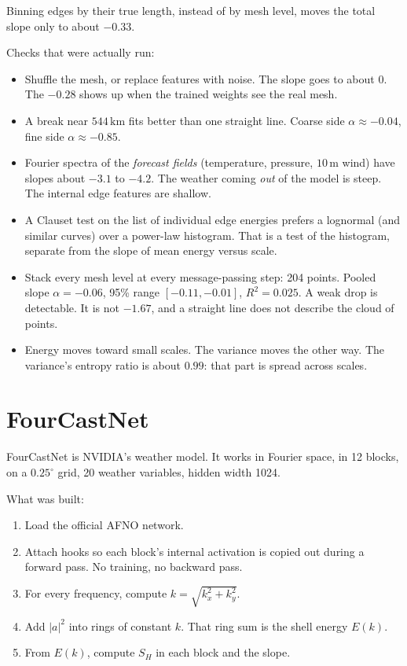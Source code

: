 \documentclass[11pt,a4paper]{article}
\begin{document}
Binning edges by their true length, instead of by mesh level, moves the total slope only to about \(-0.33\).

Checks that were actually run:
\begin{itemize}
  \item Shuffle the mesh, or replace features with noise. The slope goes to about \(0\). The \(-0.28\) shows up when the trained weights see the real mesh.
  \item A break near \(544\,\mathrm{km}\) fits better than one straight line. Coarse side \(\alpha \approx -0.04\), fine side \(\alpha \approx -0.85\).
  \item Fourier spectra of the \emph{forecast fields} (temperature, pressure, \(10\,\mathrm{m}\) wind) have slopes about \(-3.1\) to \(-4.2\). The weather coming \emph{out} of the model is steep. The internal edge features are shallow.
  \item A Clauset test on the list of individual edge energies prefers a lognormal (and similar curves) over a power-law histogram. That is a test of the histogram, separate from the slope of mean energy versus scale.
  \item Stack every mesh level at every message-passing step: 204 points. Pooled slope \(\alpha = -0.06\), 95\% range \([-0.11,-0.01]\), \(R^2 = 0.025\). A weak drop is detectable. It is not \(-1.67\), and a straight line does not describe the cloud of points.
  \item Energy moves toward small scales. The variance moves the other way. The variance's entropy ratio is about \(0.99\): that part is spread across scales.
\end{itemize}

\section*{FourCastNet}

FourCastNet is NVIDIA's weather model. It works in Fourier space, in 12 blocks, on a \(0.25^\circ\) grid, 20 weather variables, hidden width 1024.

What was built:
\begin{enumerate}
  \item Load the official AFNO network.
  \item Attach hooks so each block's internal activation is copied out during a forward pass. No training, no backward pass.
  \item For every frequency, compute \(k = \sqrt{k_x^2 + k_y^2}\).
  \item Add \(|a|^2\) into rings of constant \(k\). That ring sum is the shell energy \(E(k)\).
  \item From \(E(k)\), compute \(S_H\) in each block and the slope.
\end{enumerate}
\end{document}
